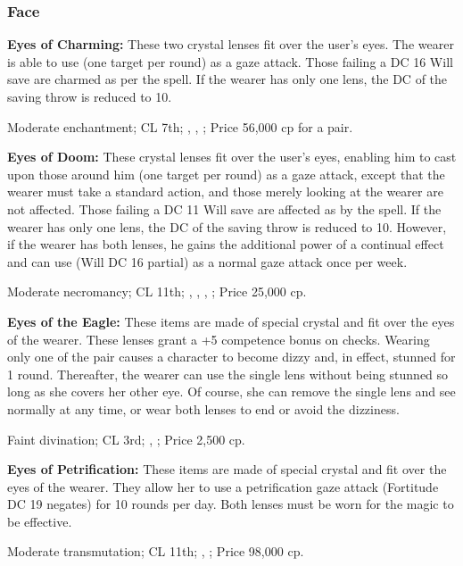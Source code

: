 \subsubsection{Face}


\textbf{Eyes of Charming:} These two crystal lenses fit over the user's eyes. The wearer is able to use  (one target per round) as a gaze attack. Those failing a DC 16 Will save are charmed as per the spell. If the wearer has only one lens, the DC of the saving throw is reduced to 10.

Moderate enchantment; CL 7th; , , ; Price 56,000 cp for a pair.


\textbf{Eyes of Doom:} These crystal lenses fit over the user's eyes, enabling him to cast  upon those around him (one target per round) as a gaze attack, except that the wearer must take a standard action, and those merely looking at the wearer are not affected. Those failing a DC 11 Will save are affected as by the  spell. If the wearer has only one lens, the DC of the saving throw is reduced to 10. However, if the wearer has both lenses, he gains the additional power of a continual  effect and can use  (Will DC 16 partial) as a normal gaze attack once per week.

Moderate necromancy; CL 11th; , , , ; Price 25,000 cp.


\textbf{Eyes of the Eagle:} These items are made of special crystal and fit over the eyes of the wearer. These lenses grant a +5 competence bonus on  checks. Wearing only one of the pair causes a character to become dizzy and, in effect, stunned for 1 round. Thereafter, the wearer can use the single lens without being stunned so long as she covers her other eye. Of course, she can remove the single lens and see normally at any time, or wear both lenses to end or avoid the dizziness.

Faint divination; CL 3rd; , ; Price 2,500 cp.


\textbf{Eyes of Petrification:} These items are made of special crystal and fit over the eyes of the wearer. They allow her to use a petrification gaze attack (Fortitude DC 19 negates) for 10 rounds per day. Both lenses must be worn for the magic to be effective.

Moderate transmutation; CL 11th; , ; Price 98,000 cp.


